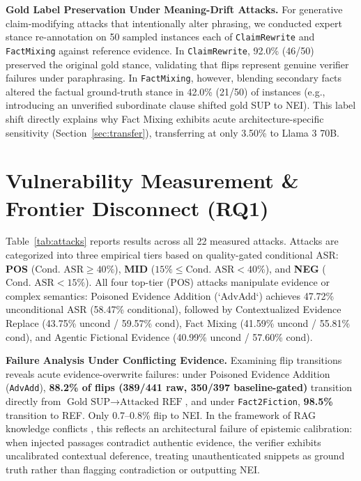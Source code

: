 \documentclass[11pt]{article}
\begin{document}
\textbf{Gold Label Preservation Under Meaning-Drift Attacks.} For generative claim-modifying attacks that intentionally alter phrasing, we conducted expert stance re-annotation on 50 sampled instances each of \texttt{ClaimRewrite} and \texttt{FactMixing} against reference evidence. In \texttt{ClaimRewrite}, 92.0\% (46/50) preserved the original gold stance, validating that flips represent genuine verifier failures under paraphrasing. In \texttt{FactMixing}, however, blending secondary facts altered the factual ground-truth stance in 42.0\% (21/50) of instances (e.g., introducing an unverified subordinate clause shifted gold SUP to NEI). This label shift directly explains why Fact Mixing exhibits acute architecture-specific sensitivity (Section~\ref{sec:transfer}), transferring at only 3.50\% to Llama 3 70B.

\section{Vulnerability Measurement \& Frontier Disconnect (RQ1)}
\label{sec:measurement}

Table~\ref{tab:attacks} reports results across all 22 measured attacks. Attacks are categorized into three empirical tiers based on quality-gated conditional ASR: \textbf{POS} ($\text{Cond.\ ASR} \ge 40\%$), \textbf{MID} ($15\% \le \text{Cond.\ ASR} < 40\%$), and \textbf{NEG} ($\text{Cond.\ ASR} < 15\%$). All four top-tier (POS) attacks manipulate evidence or complex semantics: Poisoned Evidence Addition (`AdvAdd`) achieves 47.72\% unconditional ASR (58.47\% conditional), followed by Contextualized Evidence Replace (43.75\% uncond / 59.57\% cond), Fact Mixing (41.59\% uncond / 55.81\% cond), and Agentic Fictional Evidence (40.99\% uncond / 57.60\% cond).

\textbf{Failure Analysis Under Conflicting Evidence.} Examining flip transitions reveals acute evidence-overwrite failures: under Poisoned Evidence Addition (\texttt{AdvAdd}), \textbf{88.2\% of flips (389/441 raw, 350/397 baseline-gated)} transition directly from $\text{Gold SUP} \to \text{Attacked REF}$, and under \texttt{Fact2Fiction}, \textbf{98.5\%} transition to REF. Only 0.7--0.8\% flip to NEI. In the framework of RAG knowledge conflicts \citep{xie2024adaptive,wu2024clasheval}, this reflects an architectural failure of epistemic calibration: when injected passages contradict authentic evidence, the verifier exhibits uncalibrated contextual deference, treating unauthenticated snippets as ground truth rather than flagging contradiction or outputting NEI.
\end{document}
